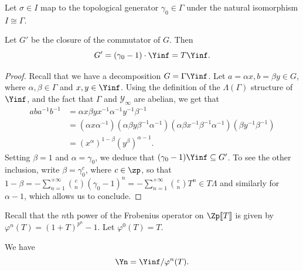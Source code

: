 \documentclass[a4paper,10pt, english, reqno]{smfart}
\newcommand{\lsem}{[\! [}
\newcommand{\rsem}{]\! ]}
\numberwithin{equation}{section}
\begin{document}
Let $\sigma \in I$ map to the topological generator $\gamma_0 \in \Gamma$ under the natural isomorphism $I \cong \Gamma$.

\begin{proposition}
Let $G'$ be the closure of the commutator of $G$. Then 
\[ G' = (\gamma_0 - 1) \cdot \Yinf = T \Yinf.\]
\end{proposition}

\begin{proof}
Recall that we have a decomposition $G = \Gamma \Yinf$. Let $a = \alpha x, b = \beta y \in G$, where $\alpha, \beta \in \Gamma$ and $x, y \in \Yinf$. Using the definition of the $\Lambda(\Gamma)$ structure of $\Yinf$, and the fact that $\Gamma$ and $\mathscr{Y}_\infty$ are abelian, we get that
\begin{align*}
ab a^{-1} b^{-1} &= \alpha x \beta y x^{-1} \alpha^{-1} y^{-1} \beta^{-1} \\
&= (\alpha x \alpha^{-1})(\alpha \beta y \beta^{-1} \alpha^{-1}) (\alpha \beta x^{-1} \beta^{-1} \alpha^{-1}) (\beta y^{-1} \beta^{-1}) \\
&= (x^\alpha)^{1 - \beta} (y^\beta)^{\alpha - 1}.
\end{align*}
Setting $\beta = 1$ and $\alpha = \gamma_0$, we deduce that $(\gamma_0 - 1) \Yinf \subseteq G'$. To see the other inclusion, write $\beta = \gamma_0^c$, where $c \in \zp$, so that $1 - \beta = - \sum_{n = 1}^{+ \infty} {c \choose n} (\gamma_0 - 1)^n = - \sum_{n = 1}^{+ \infty} {c \choose n} T^n \in T \Lambda$ and similarly for $\alpha - 1$, which allows us to conclude.
\end{proof}

Recall that the $n$th power of the Frobenius operator on $\Zp\lsem T\rsem$ is given by $\varphi^n(T) = (1 + T)^{p^n} - 1$. Let $\varphi^0(T) = T$.

\begin{proposition} \label{prop:Iwmu2}
We have \[ \Yn = \Yinf / \varphi^n(T). \]
\end{proposition}
\end{document}
